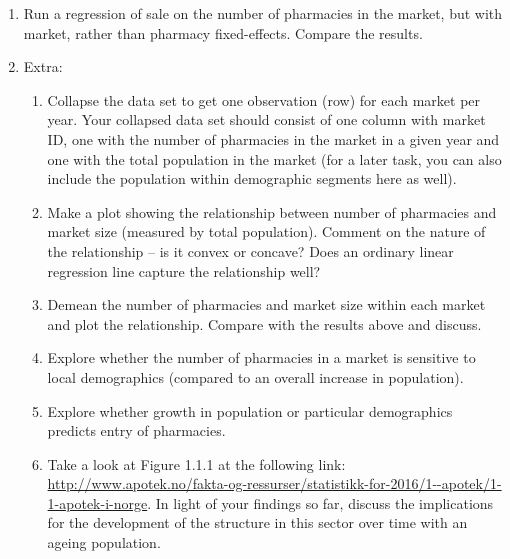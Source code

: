 \documentclass[12pt,a4paper]{article}
\begin{document}
\begin{enumerate}
 \item Run a regression of sale on the number of pharmacies in the market, but with market, rather than pharmacy fixed-effects. Compare the results.
\item Extra: 
\begin{enumerate}
\item Collapse the data set to get one observation (row) for each market per year. Your collapsed data set should consist of one column with market ID, one with the number of pharmacies in the market in a given year and one with the total population in the market (for a later task, you can also include the population within demographic segments here as well).
\item Make a plot showing the relationship between number of pharmacies and market size (measured by total population). Comment on the nature of the relationship -- is it convex or concave? Does an ordinary linear regression line capture the relationship well?
\item Demean the number of pharmacies and market size within each market and plot the relationship. Compare with the results above and discuss.
\item Explore whether the number of pharmacies in a market is sensitive to local demographics (compared to an overall increase in population).
\item Explore whether growth in population or particular demographics predicts entry of pharmacies.
\item Take a look at Figure 1.1.1 at the following link: \url{http://www.apotek.no/fakta-og-ressurser/statistikk-for-2016/1--apotek/1-1-apotek-i-norge}. In light of your findings so far, discuss the implications for the development of the structure in this sector over time with an ageing population.
\end{enumerate}
\end{enumerate}
\end{document}
